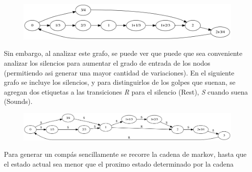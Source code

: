 \documentclass[a4paper,10pt]{article}
\begin{document}
\begin{figure}[h]
\begin{center}
\includegraphics[width=12cm]{images/grafo_sin_etiquetas.png}
\label{fig:grafo_sin_etiquetas}
\end{center}
\end{figure}

Sin embargo, al analizar este grafo, se puede ver que puede que sea conveniente analizar los silencios para aumentar el grado de entrada de los nodos
(permitiendo asi generar una mayor cantidad de variaciones). En el siguiente grafo se incluye los silencios, y para distinguirlos de los golpes que 
suenan, se agregan dos etiquetas a las transiciones \emph{R} para el silencio (Rest), \emph{S} cuando suena (Sounds).

\begin{figure}[h]
\begin{center}
\includegraphics[width=12cm]{images/grafo_con_etiquetas.png}
\label{fig:grafo_con_etiquetas}
\end{center}
\end{figure}

Para generar un comp\'as sencillamente se recorre la cadena de markov, hasta que el estado actual sea menor que el proximo estado determinado por la cadena
\end{document}
